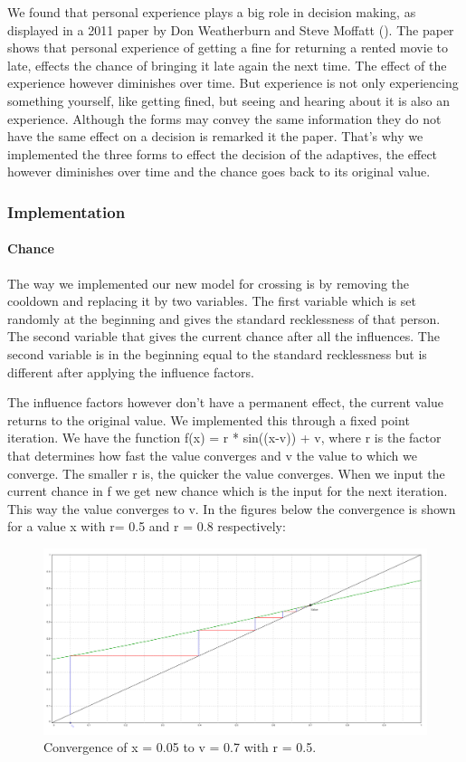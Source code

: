 \documentclass[a4paper]{article}
\begin{document}
We found that personal experience plays a big role in decision making, as displayed in a 2011 paper by Don Weatherburn and Steve Moffatt (\cite{movies}). The paper shows that personal experience of getting a fine for returning a rented movie to late, effects the chance of bringing it late again the next time. The effect of the experience however diminishes over time. But experience is not only experiencing something yourself, like getting fined, but seeing and hearing about it is also an experience. Although the forms may convey the same information they do not have the same effect on a decision is remarked it the paper. That's why we implemented the three forms to effect the decision of the adaptives, the effect however diminishes over time and the chance goes back to its original value.


\subsubsection{Implementation}
\paragraph{Chance}
The way we implemented our new model for crossing is by removing the cooldown and replacing it by two variables. The first variable which is set randomly at the beginning and gives the standard recklessness of that person. The second variable that gives the current chance after all the influences. The second variable is in the beginning equal to the standard recklessness but is different after applying the influence factors.

The influence factors however don't have a permanent effect, the current value returns to the original value. We implemented this through a fixed point iteration. We have the function f(x) = r * sin((x-v)) + v, where r is the factor that determines how fast the value converges and v the value to which we converge. The smaller r is, the quicker the value converges. When we input the current chance in f we get new chance which is the input for the next iteration. This way the value converges to v. In the figures below the convergence is shown for a value x with r= 0.5 and r = 0.8 respectively:

\begin{figure}[H]
\centering
\includegraphics[width=.9\textwidth]{iteration1.png}
\caption{Convergence of x = 0.05 to v = 0.7 with r = 0.5.}
\label{ABlabel}
\end{figure}
\end{document}
